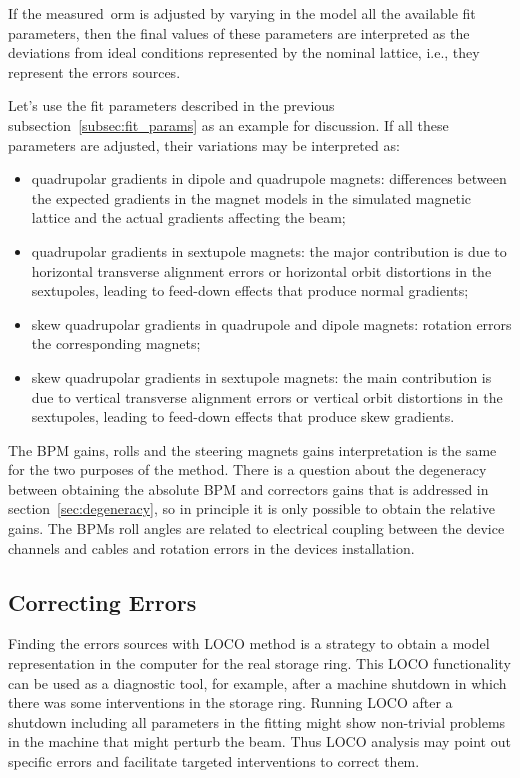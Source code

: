 If the measured~\gls{orm} is adjusted by varying in the model all the available fit parameters, then the final values of these parameters are interpreted as the deviations from ideal conditions represented by the nominal lattice, i.e., they represent the errors sources. 

Let's use the fit parameters described in the previous subsection~\ref{subsec:fit_params} as an example for discussion. If all these parameters are adjusted, their variations may be interpreted as:
\begin{itemize}
    \item quadrupolar gradients in dipole and quadrupole magnets: differences between the expected gradients in the magnet models in the simulated magnetic lattice and the actual gradients affecting the beam;
    \item quadrupolar gradients in sextupole magnets: the major contribution is due to horizontal transverse alignment errors or horizontal orbit distortions in the sextupoles, leading to feed-down effects that produce normal gradients;
    \item skew quadrupolar gradients in quadrupole and dipole magnets: rotation errors the corresponding magnets;
    \item skew quadrupolar gradients in sextupole magnets: the main contribution is due to vertical transverse alignment errors or vertical orbit distortions in the sextupoles, leading to feed-down effects that produce skew gradients.
    \end{itemize}
The BPM gains, rolls and the steering magnets gains interpretation is the same for the two purposes of the method. There is a question about the degeneracy between obtaining the absolute BPM and correctors gains that is addressed in section~\ref{sec:degeneracy}, so in principle it is only possible to obtain the relative gains. The BPMs roll angles are related to electrical coupling between the device channels and cables and rotation errors in the devices installation.
\subsection{Correcting Errors}
Finding the errors sources with LOCO method is a strategy to obtain a model representation in the computer for the real storage ring. This LOCO functionality can be used as a diagnostic tool, for example, after a machine shutdown in which there was some interventions in the storage ring. Running LOCO after a shutdown including all parameters in the fitting might show non-trivial problems in the machine that might perturb the beam. Thus LOCO analysis may point out specific errors and facilitate targeted interventions to correct them.

